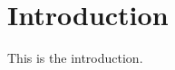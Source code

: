 \documentclass[../main.tex]{subfiles}
\begin{document}
\section{Introduction}

This is the introduction.
\end{document}
